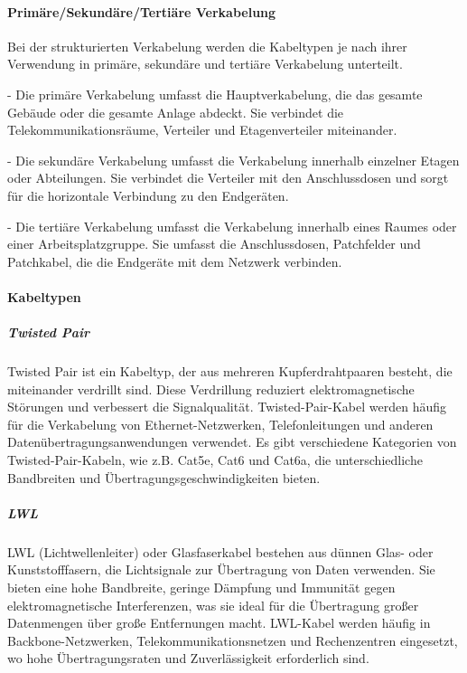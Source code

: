 \paragraph{Primäre/Sekundäre/Tertiäre Verkabelung}

Bei der strukturierten Verkabelung werden die Kabeltypen je nach ihrer Verwendung in primäre, sekundäre und tertiäre Verkabelung unterteilt.

- Die primäre Verkabelung umfasst die Hauptverkabelung, die das gesamte Gebäude oder die gesamte Anlage abdeckt. Sie verbindet die Telekommunikationsräume, Verteiler und Etagenverteiler miteinander.

- Die sekundäre Verkabelung umfasst die Verkabelung innerhalb einzelner Etagen oder Abteilungen. Sie verbindet die Verteiler mit den Anschlussdosen und sorgt für die horizontale Verbindung zu den Endgeräten.

- Die tertiäre Verkabelung umfasst die Verkabelung innerhalb eines Raumes oder einer Arbeitsplatzgruppe. Sie umfasst die Anschlussdosen, Patchfelder und Patchkabel, die die Endgeräte mit dem Netzwerk verbinden.

\paragraph{Kabeltypen}

\subparagraph{Twisted Pair}

Twisted Pair ist ein Kabeltyp, der aus mehreren Kupferdrahtpaaren besteht, die miteinander verdrillt sind. Diese Verdrillung reduziert elektromagnetische Störungen und verbessert die Signalqualität. Twisted-Pair-Kabel werden häufig für die Verkabelung von Ethernet-Netzwerken, Telefonleitungen und anderen Datenübertragungsanwendungen verwendet. Es gibt verschiedene Kategorien von Twisted-Pair-Kabeln, wie z.B. Cat5e, Cat6 und Cat6a, die unterschiedliche Bandbreiten und Übertragungsgeschwindigkeiten bieten.

\subparagraph{LWL}

LWL (Lichtwellenleiter) oder Glasfaserkabel bestehen aus dünnen Glas- oder Kunststofffasern, die Lichtsignale zur Übertragung von Daten verwenden. Sie bieten eine hohe Bandbreite, geringe Dämpfung und Immunität gegen elektromagnetische Interferenzen, was sie ideal für die Übertragung großer Datenmengen über große Entfernungen macht. LWL-Kabel werden häufig in Backbone-Netzwerken, Telekommunikationsnetzen und Rechenzentren eingesetzt, wo hohe Übertragungsraten und Zuverlässigkeit erforderlich sind.

